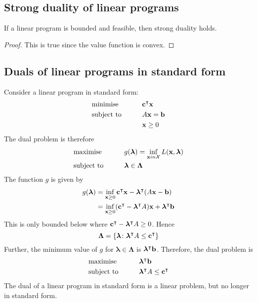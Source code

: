 \subsection{Strong duality of linear programs}
\begin{theorem}
	If a linear program is bounded and feasible, then strong duality holds.
\end{theorem}
\begin{proof}
	This is true since the value function is convex.
\end{proof}

\subsection{Duals of linear programs in standard form}
Consider a linear program in standard form:
\begin{alignat*}{2}
	 & \text{minimise}   & \qquad & \vb c^\intercal \vb x \\
	 & \text{subject to} &        & A \vb x = \vb b        \\
	 &                   &        & \vb x \geq 0
\end{alignat*}
The dual problem is therefore
\begin{alignat*}{2}
	 & \text{maximise}   & \qquad & g(\bm \lambda) = \inf_{\vb x in \mathcal X} L(\vb x, \bm \lambda) \\
	 & \text{subject to} &        & \bm \lambda \in \bm \Lambda                                       \\
\end{alignat*}
The function \( g \) is given by
\begin{align*}
	g(\bm \lambda) & = \inf_{\vb x \geq 0} \vb c^\intercal \vb x - \bm \lambda^\intercal (A \vb x - \vb b)                 \\
	               & = \inf_{\vb x \geq 0} (\vb c^\intercal - \bm \lambda^\intercal A)\vb x + \bm \lambda^\intercal \vb b
\end{align*}
This is only bounded below where \( \vb c^\intercal - \bm \lambda^\intercal A \geq 0 \).
Hence
\[
	\bm \Lambda = \qty{\bm \lambda \colon \bm \lambda^\intercal A \leq \vb c^\intercal}
\]
Further, the minimum value of \( g \) for \( \bm \lambda \in \bm \Lambda \) is \( \bm \lambda^\intercal \vb b \).
Therefore, the dual problem is
\begin{alignat*}{2}
	 & \text{maximise}   & \qquad & \bm \lambda^\intercal \vb b                   \\
	 & \text{subject to} &        & \bm \lambda^\intercal A \leq \vb c^\intercal \\
\end{alignat*}
The dual of a linear program in standard form is a linear problem, but no longer in standard form.

